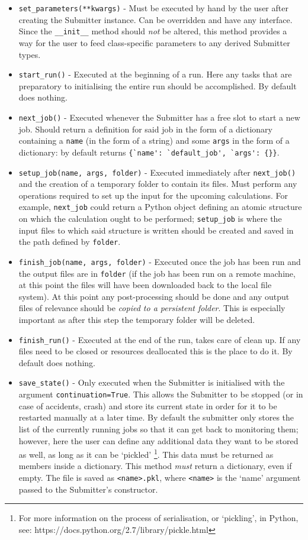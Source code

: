\documentclass[]{report}
\begin{document}
\begin{itemize}
	\item \lstinline|set_parameters(**kwargs)| - Must be executed by hand by the user after creating the Submitter instance. Can be overridden and have any interface. Since the \lstinline|__init__| method should \textit{not} be altered, this method provides a way for the user to feed class-specific parameters to any derived Submitter types. 
	\item \lstinline|start_run()| - Executed at the beginning of a run. Here any tasks that are preparatory to initialising the entire run should be accomplished. By default does nothing.
	\item \lstinline|next_job()| - Executed whenever the Submitter has a free slot to start a new job. Should return a definition for said job in the form of a dictionary containing a \lstinline|name| (in the form of a string) and some \lstinline|args| in the form of a dictionary: by default returns \lstinline|{`name': `default_job', `args': {}}|.
	\item \lstinline|setup_job(name, args, folder)| - Executed immediately after \lstinline|next_job()| and the creation of a temporary folder to contain its files. Must perform any operations required to set up the input for the upcoming calculations. For example, \lstinline|next_job| could return a Python object defining an atomic structure on which the calculation ought to be performed; \lstinline|setup_job| is where the input files to which said structure is written should be created and saved in the path defined by \lstinline|folder|.
	\item \lstinline|finish_job(name, args, folder)| - Executed once the job has been run and the output files are in \lstinline|folder| (if the job has been run on a remote machine, at this point the files will have been downloaded back to the local file system). At this point any post-processing should be done and any output files of relevance should be \textit{copied to a persistent folder}. This is especially important as after this step the temporary folder will be deleted.
	\item \lstinline|finish_run()| - Executed at the end of the run, takes care of clean up. If any files need to be closed or resources deallocated this is the place to do it. By default does nothing.
	\item \lstinline|save_state()| - Only executed when the Submitter is initialised with the argument \lstinline|continuation=True|. This allows the Submitter to be stopped (or in case of accidents, crash) and store its current state in order for it to be restarted manually at a later time. By default the submitter only stores the list of the currently running jobs so that it can get back to monitoring them; however, here the user can define any additional data they want to be stored as well, as long as it can be `pickled' \footnote{For more information on the process of serialisation, or `pickling', in Python, see: https://docs.python.org/2.7/library/pickle.html}. This data must be returned as members inside a dictionary. This method \textit{must} return a dictionary, even if empty. The file is saved as \lstinline|<name>.pkl|, where \lstinline|<name>| is the `name' argument passed to the Submitter's constructor.

\end{itemize}
\end{document}

